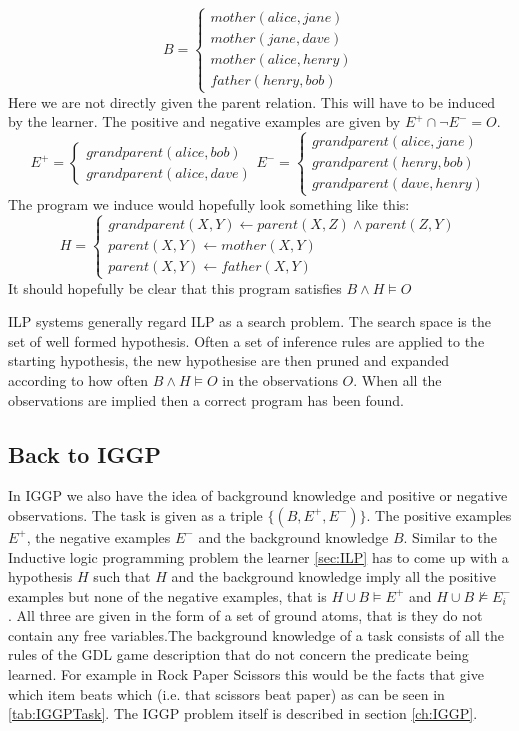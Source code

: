 \[
B=
\begin{cases}
mother(alice,jane)\\
mother(jane,dave)\\
mother(alice,henry)\\
father(henry,bob)
\end{cases}
\]
Here we are not directly given the parent relation. This will have to be induced by the learner. The positive and negative examples are given by $E^+ \cap \neg E^- = O$.
\[
E^+=
\begin{cases}
grandparent(alice,bob)\\
grandparent(alice,dave)
\end{cases}
E^-=
\begin{cases}
grandparent(alice,jane)\\
grandparent(henry,bob)\\
grandparent(dave,henry)
\end{cases}
\]
The program we induce would hopefully look something like this:
\[H=\begin{cases}
grandparent(X,Y) \leftarrow parent(X,Z) \wedge parent(Z,Y)\\
parent(X,Y) \leftarrow mother(X,Y)\\
parent(X,Y) \leftarrow father(X,Y)
\end{cases}\]
It should hopefully be clear that this program satisfies $B \wedge H \vDash O$

ILP systems generally regard ILP as a search problem. The search space is the set of well formed hypothesis. Often a set of inference rules are applied to the starting hypothesis, the new hypothesise are then pruned and expanded according to how often $B \wedge H \vDash O$ in the observations $O$. When all the observations are implied then a correct program has been found.

\subsection{Back to IGGP}

In IGGP we also have the idea of background knowledge and positive or negative observations. The task is given as a triple $\{(B,E^+,E^-)\}$. The positive examples $E^+$, the negative examples  $E^-$ and the background knowledge $B$. Similar to the Inductive logic programming problem the learner \ref{sec:ILP} has to come up with a hypothesis $H$ such that $H$ and the background knowledge imply all the positive examples but none of the negative examples, that is $H \cup B \models E^+$ and $H \cup B \not\models E_i^-$. All three are given in the form of a set of ground atoms, that is they do not contain any free variables.The background knowledge of a task consists of all the rules of the GDL game description that do not concern the predicate being learned. For example in Rock Paper Scissors this would be the facts that give which item beats which (i.e. that scissors beat paper) as can be seen in \ref{tab:IGGPTask}. The IGGP problem itself is described in section \ref{ch:IGGP}.

